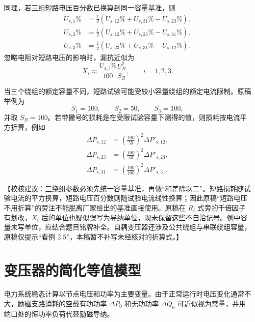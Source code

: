 \documentclass[
  12pt,
  UTF8,
  a4paper,
  fontset=fandol,
  oneside,
  openany
]{ctexrep}
\newcommand{\reviewnote}[1]{%
  \par\smallskip
  {\color{reviewgray}\small\noindent【校核建议：#1】\par}
  \smallskip
}
\begin{document}
同理，若三组短路电压百分数已换算到同一容量基准，则
\begin{align}
  U_{s,1}\% & =\frac{1}{2}
  \left(U_{s,12}\%+U_{s,31}\%-U_{s,23}\%\right), \\
  U_{s,2}\% & =\frac{1}{2}
  \left(U_{s,12}\%+U_{s,23}\%-U_{s,31}\%\right), \\
  U_{s,3}\% & =\frac{1}{2}
  \left(U_{s,23}\%+U_{s,31}\%-U_{s,12}\%\right).
\end{align}
忽略电阻对短路电压的影响时，漏抗近似为
\begin{equation}
  X_i\approx\frac{U_{s,i}\%}{100}\frac{U_B^2}{S_B},
  \qquad i=1,2,3.
\end{equation}

当三个绕组的额定容量不同，短路试验可能受较小容量绕组的额定电流限制。原稿举例为
\begin{equation}
  S_1=100,\qquad S_2=50,\qquad S_3=100,
\end{equation}
并取 $S_B=100$。若带撇号的损耗是在受限试验容量下测得的值，则损耗按电流平方折算，例如
\begin{align}
  \Delta P_{s,12} & =\left(\frac{100}{50}\right)^2\Delta P'_{s,12},  \\
  \Delta P_{s,23} & =\left(\frac{100}{50}\right)^2\Delta P'_{s,23},  \\
  \Delta P_{s,31} & =\left(\frac{100}{100}\right)^2\Delta P'_{s,31}.
\end{align}

\reviewnote{三绕组参数必须先统一容量基准，再做“和差除以二”。短路损耗随试验电流的平方换算，短路电压百分数则随试验电流线性换算；因此原稿“短路电压不用折算”的旁注不能脱离厂家给出的基准直接使用。原稿在 $R_i$ 式旁的千倍因子有划改，$X_i$ 后的单位也疑似误写为导纳单位，现未保留这些不自洽记号。例中容量未写单位，应结合题目铭牌补全。自耦变压器还涉及公共绕组与串联绕组容量，原稿仅提示“看例 2.5”，本稿暂不补写未经核对的折算式。}

\section{变压器的简化等值模型}

电力系统稳态计算以节点电压和功率为主要变量。由于正常运行时电压变化通常不大，励磁支路消耗的空载有功功率 $\Delta P_0$ 和无功功率 $\Delta Q_0$ 可近似视为常量，并用端口处的恒功率负荷代替励磁导纳。
\end{document}

